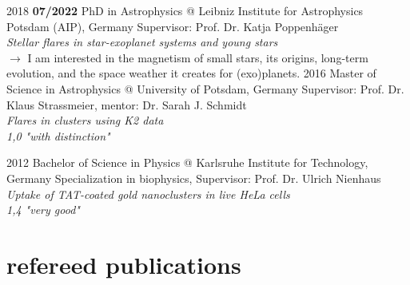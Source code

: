\documentclass[9.5pt]{k-cv} %
\begin{document}
\begin{entrylist}
\entry
{2018 \to \textbf{07/2022}}
{PhD {\normalfont in Astrophysics} @ Leibniz Institute for Astrophysics Potsdam (AIP), Germany}
{}
{Supervisor: Prof. Dr. Katja Poppenh\"ager\\
\emph{Stellar flares in star-exoplanet systems and young stars}\vspace{.3cm}\\
$\rightarrow$ I am interested in the magnetism of small stars, its origins, long-term evolution, and the space weather it creates for (exo)planets.\vspace{.3cm}}
\entry
{2016 }
{Master {\normalfont of Science in Astrophysics} @ University of Potsdam, Germany}
{}
{Supervisor: Prof. Dr. Klaus Strassmeier, mentor: Dr. Sarah J. Schmidt\\
\emph{Flares in clusters using K2 data}\\ \emph{1,0 "with distinction"}}%


\entry
{2012 }
{Bachelor {\normalfont of Science in Physics} @ Karlsruhe Institute for Technology, Germany}
{}
{Specialization in biophysics, Supervisor: Prof. Dr. Ulrich Nienhaus\\
\emph{Uptake of TAT-coated gold nanoclusters in live HeLa cells}\\
\emph{1,4 "very good"}}
\end{entrylist}



\section{refereed publications}

\end{document}
